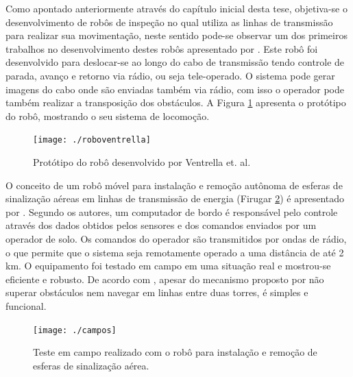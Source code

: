 Como apontado anteriormente através do capítulo inicial desta tese, objetiva-se o desenvolvimento de robôs de inspeção no qual utiliza as linhas de transmissão para realizar sua movimentação, neste sentido pode-se observar um dos primeiros trabalhos no desenvolvimento destes robôs apresentado por . Este robô foi desenvolvido para deslocar-se ao longo do cabo de transmissão tendo controle de parada, avanço e retorno via rádio, ou seja tele-operado. O sistema pode gerar imagens do cabo onde são enviadas também via rádio, com isso o operador pode também realizar a transposição dos obstáculos. A Figura \ref{img:roboventrella} apresenta o protótipo do robô, mostrando o seu sistema de locomoção.

\begin{figure} [h!]	
	\caption{Protótipo do robô desenvolvido por Ventrella et. al.}
	\label{img:roboventrella}											 
	\centering													 
	\texttt{[image: ./roboventrella]}
\end{figure}													 

O conceito de um robô móvel para instalação e remoção autônoma de esferas de sinalização aéreas em linhas de transmissão de energia (Firugar \ref{img:campos}) é apresentado por . Segundo os autores, um computador de bordo é responsável pelo controle através dos dados obtidos pelos sensores e dos comandos enviados por um operador de solo. Os comandos do operador são transmitidos por ondas de rádio, o que permite que o sistema seja remotamente operado a uma distância de até 2 km. O equipamento foi testado em campo em uma situação real e mostrou-se eficiente e robusto. De acordo com , apesar do mecanismo proposto por  não superar obstáculos nem navegar em linhas entre duas torres, é simples e funcional.

\begin{figure} [h!]	
	\caption{Teste em campo realizado com o robô para instalação e remoção de esferas de sinalização aérea.}
	\label{img:campos}											 
	\centering													 
	\texttt{[image: ./campos]}
\end{figure}													 

